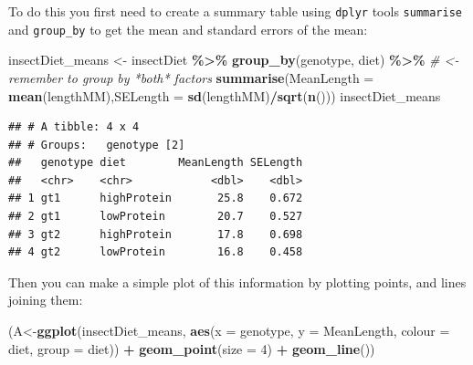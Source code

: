 \documentclass[
  a4paperpaper,
]{book}
\newenvironment{Shaded}{\begin{snugshade}}{\end{snugshade}}
\newcommand{\CommentTok}[1]{\textcolor[rgb]{0.56,0.35,0.01}{\textit{#1}}}
\newcommand{\DataTypeTok}[1]{\textcolor[rgb]{0.13,0.29,0.53}{#1}}
\newcommand{\DecValTok}[1]{\textcolor[rgb]{0.00,0.00,0.81}{#1}}
\newcommand{\KeywordTok}[1]{\textcolor[rgb]{0.13,0.29,0.53}{\textbf{#1}}}
\newcommand{\NormalTok}[1]{#1}
\newcommand{\OperatorTok}[1]{\textcolor[rgb]{0.81,0.36,0.00}{\textbf{#1}}}
\newcommand{\StringTok}[1]{\textcolor[rgb]{0.31,0.60,0.02}{#1}}
\begin{document}
To do this you first need to create a summary table using \texttt{dplyr} tools \texttt{summarise} and \texttt{group\_by} to get the mean and standard errors of the mean:

\begin{Shaded}
\begin{Highlighting}[]
\NormalTok{insectDiet\_means \textless{}{-}}\StringTok{ }
\StringTok{  }\NormalTok{insectDiet }\OperatorTok{\%\textgreater{}\%}\StringTok{ }
\StringTok{  }\KeywordTok{group\_by}\NormalTok{(genotype, diet) }\OperatorTok{\%\textgreater{}\%}\StringTok{ }\CommentTok{\# \textless{}{-} remember to group by *both* factors}
\StringTok{  }\KeywordTok{summarise}\NormalTok{(}\DataTypeTok{MeanLength =} \KeywordTok{mean}\NormalTok{(lengthMM),}\DataTypeTok{SELength =} \KeywordTok{sd}\NormalTok{(lengthMM)}\OperatorTok{/}\KeywordTok{sqrt}\NormalTok{(}\KeywordTok{n}\NormalTok{()))}
\NormalTok{insectDiet\_means}
\end{Highlighting}
\end{Shaded}

\begin{verbatim}
## # A tibble: 4 x 4
## # Groups:   genotype [2]
##   genotype diet        MeanLength SELength
##   <chr>    <chr>            <dbl>    <dbl>
## 1 gt1      highProtein       25.8    0.672
## 2 gt1      lowProtein        20.7    0.527
## 3 gt2      highProtein       17.8    0.698
## 4 gt2      lowProtein        16.8    0.458
\end{verbatim}

Then you can make a simple plot of this information by plotting points, and lines joining them:

\begin{Shaded}
\begin{Highlighting}[]
\NormalTok{(A\textless{}{-}}\KeywordTok{ggplot}\NormalTok{(insectDiet\_means, }
       \KeywordTok{aes}\NormalTok{(}\DataTypeTok{x =}\NormalTok{ genotype, }\DataTypeTok{y =}\NormalTok{ MeanLength, }\DataTypeTok{colour =}\NormalTok{ diet, }\DataTypeTok{group =}\NormalTok{ diet)) }\OperatorTok{+}
\StringTok{  }\KeywordTok{geom\_point}\NormalTok{(}\DataTypeTok{size =} \DecValTok{4}\NormalTok{) }\OperatorTok{+}\StringTok{ }
\StringTok{  }\KeywordTok{geom\_line}\NormalTok{())}
\end{Highlighting}
\end{Shaded}
\end{document}
